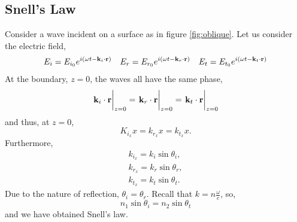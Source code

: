 \documentclass{book}
\begin{document}
\subsection{Snell's Law}
Consider a wave incident on a surface as in figure \ref{fig:oblique}. Let us consider the electric field,
\begin{align}
	E_i = E_{i_0}e^{i(\omega t - \vb{k}_i\cdot{\vb{r}})} && E_r = E_{r_0}e^{i(\omega t - \vb{k}_r\cdot{\vb{r}})} && E_t = E_{t_0}e^{i(\omega t - \vb{k}_t\cdot{\vb{r}})} 
\end{align}
At the boundary, $z = 0$, the waves all have the same phase,
\begin{align}
	\eval{\vb{k}_i\cdot\vb{r}}_{z=0} = \eval{\vb{k}_r\cdot\vb{r}}_{z=0} = \eval{\vb{k}_t\cdot\vb{r}}_{z=0}
\end{align}
and thus, at $z = 0$,
\begin{equation}
	K_{i_x} x = k_{r_x}x = k_{t_x}x.
\end{equation}
Furthermore,
\begin{align}
	k_{i_x} = k_i \sin\theta_i,\label{eq:kti} \\
	k_{r_x} = k_r \sin\theta_r, \\
	k_{t_x} = k_t \sin\theta_t. \label{eq:ktx}
\end{align}
Due to the nature of reflection, $\theta_i = \theta_r$. Recall that $k = n\frac{\omega}{c}$, so,
\begin{equation}
	\boxed{n_1\sin\theta_i = n_2\sin\theta_t}
\end{equation}
and we have obtained Snell's law.
\end{document}
